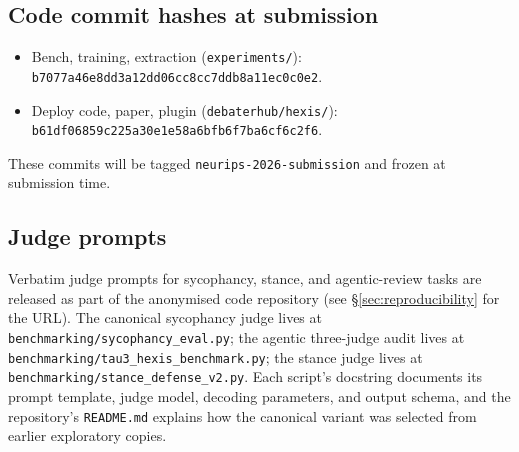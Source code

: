 \subsection{Code commit hashes at submission}

\begin{itemize}[leftmargin=*]
\item Bench, training, extraction (\texttt{experiments/}): \texttt{b7077a46e8dd3a12dd06cc8cc7ddb8a11ec0c0e2}.
\item Deploy code, paper, plugin (\texttt{debaterhub/hexis/}): \texttt{b61df06859c225a30e1e58a6bfb6f7ba6cf6c2f6}.
\end{itemize}

These commits will be tagged \texttt{neurips-2026-submission} and frozen at submission time.

\subsection{Judge prompts}

Verbatim judge prompts for sycophancy, stance, and agentic-review tasks are released as part of the anonymised code repository (see \S\ref{sec:reproducibility} for the URL). The canonical sycophancy judge lives at \texttt{benchmarking/sycophancy\_eval.py}; the agentic three-judge audit lives at \texttt{benchmarking/tau3\_hexis\_benchmark.py}; the stance judge lives at \texttt{benchmarking/stance\_defense\_v2.py}. Each script's docstring documents its prompt template, judge model, decoding parameters, and output schema, and the repository's \texttt{README.md} explains how the canonical variant was selected from earlier exploratory copies.
